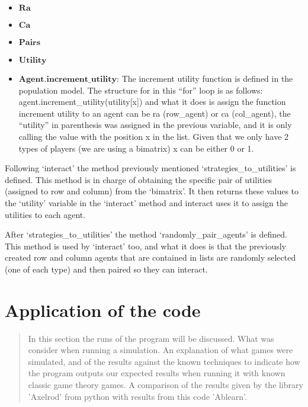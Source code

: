 \documentclass{article}
\begin{document}
\begin{itemize}
\item $\textbf{Ra}$
\item $\textbf{Ca}$
\item $\textbf{Pairs}$
\item $\textbf{Utility}$
\item $\textbf{Agent.increment\_utility}$: The increment utility function is defined in the population model. The structure for in this “for” loop is as follows:
\\ agent.increment\_utility(utility[x]) and what it does is assign the function increment utility to an agent can be ra (row\_agent) or ca (col\_agent), the ``utility'' in parenthesis was assigned in the previous variable, and it is only calling the value with the position x in the list. Given that we only have 2 types of players (we are using a bimatrix) x can be either 0 or 1.
\end{itemize}

Following `interact’ the method previously mentioned `strategies\_to\_utilities’ is defined. This method is in charge of obtaining the specific pair of utilities (assigned to row and column) from the ‘bimatrix’. It then returns these values to the `utility’ variable in the `interact’ method and interact uses it to assign the utilities to each agent.

After `strategies\_to\_utilities’ the method `randomly\_pair\_agents’ is defined. This method is used by `interact’ too, and what it does is that the previously created row and column agents that are contained in lists are randomly selected (one of each type) and then paired so they can interact.



\newpage
\section{Application of the code}

\maketitle
\begin{abstract}
In this section the runs of the program will be discussed. What was consider when running a simulation. An explanation of what games were simulated, and of the results against the known techniques to indicate how the program outputs our expected results when running it with known classic game theory games. A comparison of the results given by the  library 'Axelrod' from python with results from this code 'Ablearn'.
\end{abstract}
\end{document}
